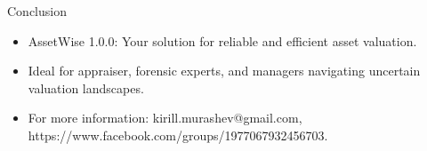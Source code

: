 \documentclass{beamer}
\begin{document}
\begin{frame}{Conclusion}
	\begin{itemize}
		\item AssetWise 1.0.0: Your solution for reliable and efficient asset valuation.
		\item Ideal for appraiser, forensic experts, and managers navigating uncertain valuation landscapes.
		\item For more information: kirill.murashev@gmail.com, https://www.facebook.com/groups/1977067932456703.
	\end{itemize}
\end{frame}
\end{document}
